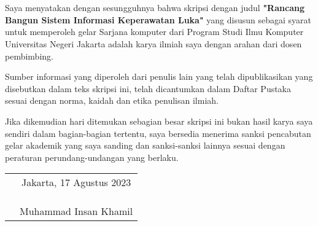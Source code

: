 \chapter*{}

Saya menyatakan dengan sesungguhnya bahwa skripsi dengan judul 	\textbf{"Rancang Bangun Sistem Informasi Keperawatan Luka"} yang disusun sebagai syarat untuk memperoleh gelar Sarjana komputer dari Program Studi Ilmu Komputer Universitas Negeri Jakarta adalah karya ilmiah saya dengan arahan dari dosen pembimbing.

Sumber informasi yang diperoleh dari penulis lain yang
telah dipublikasikan yang disebutkan dalam teks skripsi ini, telah dicantumkan dalam Daftar Pustaka sesuai dengan norma, kaidah dan etika penulisan ilmiah.

Jika dikemudian hari ditemukan sebagian besar skripsi ini bukan hasil karya saya sendiri dalam bagian-bagian tertentu, saya bersedia menerima sanksi pencabutan gelar akademik yang saya sanding dan sanksi-sanksi lainnya sesuai dengan peraturan perundang-undangan yang berlaku.

\vspace{.5cm}

\begin{tabular}{p{7.5cm}c}
	&Jakarta, 17 Agustus 2023\\
	&\\
	&\\
	&\\
	&Muhammad Insan Khamil
\end{tabular}